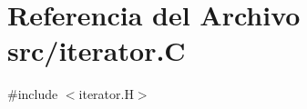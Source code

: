 \hypertarget{iterator_8_c}{}\section{Referencia del Archivo src/iterator.C}
\label{iterator_8_c}
{\ttfamily \#include $<$iterator.\+H$>$}\newline
